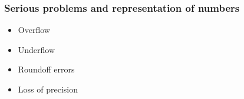 \documentclass{beamer}
\newenvironment{block_mdfboxadmon}[1][]{\begin{block}{#1}}{\end{block}}
\begin{document}
\begin{frame}
\frametitle{Serious problems and representation of numbers}

\begin{block_mdfboxadmon}

\begin{itemize}
  \item Overflow

  \item Underflow

  \item Roundoff errors

  \item Loss of precision
\end{itemize}

\noindent
\end{block_mdfboxadmon}
\end{frame}
\end{document}
